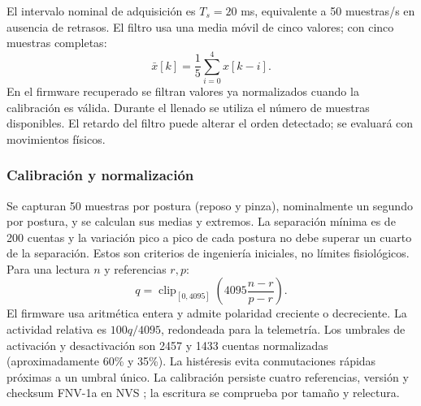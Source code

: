 \documentclass[11pt,letterpaper]{article}
\begin{document}
El intervalo nominal de adquisición es $T_s=20$ ms, equivalente a 50 muestras/s en ausencia de retrasos. El filtro usa una media móvil de cinco valores; con cinco muestras completas:
\begin{equation}\bar{x}[k]=\frac{1}{5}\sum_{i=0}^{4}x[k-i].\end{equation}
En el firmware recuperado se filtran valores ya normalizados cuando la calibración es válida. Durante el llenado se utiliza el número de muestras disponibles. El retardo del filtro puede alterar el orden detectado; se evaluará con movimientos físicos.
\subsubsection{Calibración y normalización}
Se capturan 50 muestras por postura (reposo y pinza), nominalmente un segundo por postura, y se calculan sus medias y extremos. La separación mínima es de 200 cuentas y la variación pico a pico de cada postura no debe superar un cuarto de la separación. Estos son criterios de ingeniería iniciales, no límites fisiológicos. Para una lectura $n$ y referencias $r,p$:
\begin{equation}q=\operatorname{clip}_{[0,4095]}\left(4095\frac{n-r}{p-r}\right).\end{equation}
El firmware usa aritmética entera y admite polaridad creciente o decreciente. La actividad relativa es $100q/4095$, redondeada para la telemetría. Los umbrales de activación y desactivación son 2457 y 1433 cuentas normalizadas (aproximadamente 60\% y 35\%). La histéresis evita conmutaciones rápidas próximas a un umbral único. La calibración persiste cuatro referencias, versión y checksum FNV-1a en NVS \cite{nvs}; la escritura se comprueba por tamaño y relectura.
\end{document}

